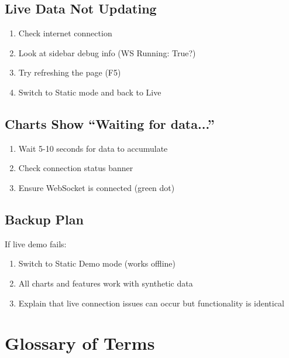 \documentclass[12pt,a4paper]{article}
\begin{document}
\subsection{Live Data Not Updating}
\begin{enumerate}
    \item Check internet connection
    \item Look at sidebar debug info (WS Running: True?)
    \item Try refreshing the page (F5)
    \item Switch to Static mode and back to Live
\end{enumerate}

\subsection{Charts Show ``Waiting for data...''}
\begin{enumerate}
    \item Wait 5-10 seconds for data to accumulate
    \item Check connection status banner
    \item Ensure WebSocket is connected (green dot)
\end{enumerate}

\subsection{Backup Plan}
If live demo fails:
\begin{enumerate}
    \item Switch to Static Demo mode (works offline)
    \item All charts and features work with synthetic data
    \item Explain that live connection issues can occur but functionality is identical
\end{enumerate}

\section{Glossary of Terms}
\end{document}
